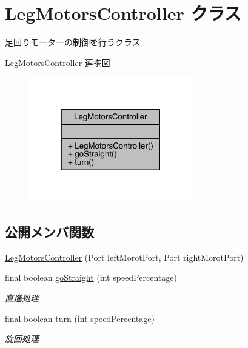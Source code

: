 \hypertarget{class_leg_motors_controller}{}\section{Leg\+Motors\+Controller クラス}
\label{class_leg_motors_controller}


足回りモーターの制御を行うクラス  




Leg\+Motors\+Controller 連携図\nopagebreak
\begin{figure}[H]
\begin{center}
\leavevmode
\includegraphics[width=202pt]{d4/d01/class_leg_motors_controller__coll__graph}
\end{center}
\end{figure}
\subsection*{公開メンバ関数}
\begin{DoxyCompactItemize}
\item 
\mbox{\hyperlink{class_leg_motors_controller_afb404bdad1a5ce5d9f71b73ade3ccbb5}{Leg\+Motors\+Controller}} (Port left\+Morot\+Port, Port right\+Morot\+Port)
\item 
final boolean \mbox{\hyperlink{class_leg_motors_controller_ad5a3db7ac941bb2e66d3efb5e3214a54}{go\+Straight}} (int speed\+Percentage)
\begin{DoxyCompactList}\small\item\em 直進処理 \end{DoxyCompactList}\item 
final boolean \mbox{\hyperlink{class_leg_motors_controller_a0df4b63d6a21857d8b5fbff3875ff962}{turn}} (int speed\+Percentage)
\begin{DoxyCompactList}\small\item\em 旋回処理 \end{DoxyCompactList}\end{DoxyCompactItemize}


